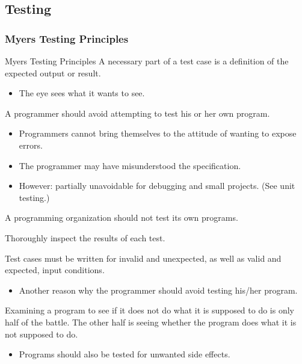 \subsection*{Testing}

\subsubsection*{Myers Testing Principles}

\begin{Frame}[allowframebreaks]{Myers Testing Principles}
  \textcolor{maincolor}{A necessary part of a test case is a definition of the expected output or result.}
  \begin{itemize}
    \item The eye sees what it wants to see.
  \end{itemize}

  \textcolor{maincolor}{A programmer should avoid attempting to test his or her own program.}
  \begin{itemize}
    \item Programmers cannot bring themselves to the attitude of wanting to expose errors.
    \item The programmer may have misunderstood the specification.
    \item However: partially unavoidable for debugging and small projects. (See unit testing.)
  \end{itemize}

  \textcolor{maincolor}{A programming organization should not test its own programs.}\\ \vspace*{1ex}

  \textcolor{maincolor}{Thoroughly inspect the results of each test.}
  
  \framebreak

  \textcolor{maincolor}{Test cases must be written for invalid and unexpected, as well as valid and expected, input conditions.}
  \begin{itemize}
    \item Another reason why the programmer should avoid testing his/her program.
  \end{itemize}

  \textcolor{maincolor}{Examining a program to see if it does not do what it is supposed to do is only half of the battle. The other half is seeing whether the program does what it is not supposed to do.}
  \begin{itemize}
    \item Programs should also be tested for \alert{unwanted side effects.}
  \end{itemize}
  

\end{Frame}
